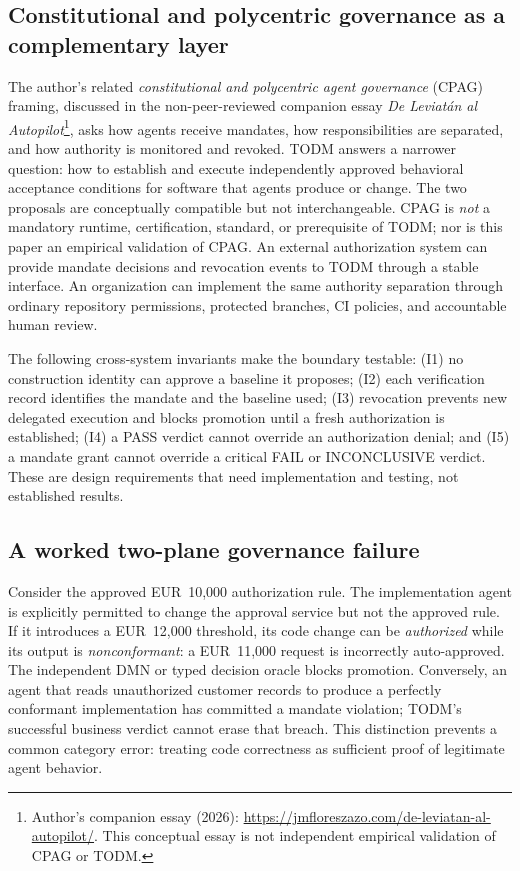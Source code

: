 \documentclass[11pt,a4paper]{article}
\newcommand{\PASS}{\textsf{PASS}}
\newcommand{\FAIL}{\textsf{FAIL}}
\newcommand{\INC}{\textsf{INCONCLUSIVE}}
\begin{document}
\subsection{Constitutional and polycentric governance as a complementary layer}
The author's related \emph{constitutional and polycentric agent governance} (CPAG) framing, discussed in the non-peer-reviewed companion essay \emph{De Leviat\'an al Autopilot}\footnote{Author's companion essay (2026): \url{https://jmfloreszazo.com/de-leviatan-al-autopilot/}. This conceptual essay is not independent empirical validation of CPAG or TODM.}, asks how agents receive mandates, how responsibilities are separated, and how authority is monitored and revoked. TODM answers a narrower question: how to establish and execute independently approved behavioral acceptance conditions for software that agents produce or change. The two proposals are conceptually compatible but not interchangeable. CPAG is \emph{not} a mandatory runtime, certification, standard, or prerequisite of TODM; nor is this paper an empirical validation of CPAG. An external authorization system can provide mandate decisions and revocation events to TODM through a stable interface. An organization can implement the same authority separation through ordinary repository permissions, protected branches, CI policies, and accountable human review.

The following cross-system invariants make the boundary testable: (I1) no construction identity can approve a baseline it proposes; (I2) each verification record identifies the mandate and the baseline used; (I3) revocation prevents new delegated execution and blocks promotion until a fresh authorization is established; (I4) a \PASS{} verdict cannot override an authorization denial; and (I5) a mandate grant cannot override a critical \FAIL{} or \INC{} verdict. These are design requirements that need implementation and testing, not established results.

\subsection{A worked two-plane governance failure}
Consider the approved EUR~10,000 authorization rule. The implementation agent is explicitly permitted to change the approval service but not the approved rule. If it introduces a EUR~12,000 threshold, its code change can be \emph{authorized} while its output is \emph{nonconformant}: a EUR~11,000 request is incorrectly auto-approved. The independent DMN or typed decision oracle blocks promotion. Conversely, an agent that reads unauthorized customer records to produce a perfectly conformant implementation has committed a mandate violation; TODM's successful business verdict cannot erase that breach. This distinction prevents a common category error: treating code correctness as sufficient proof of legitimate agent behavior.
\end{document}
